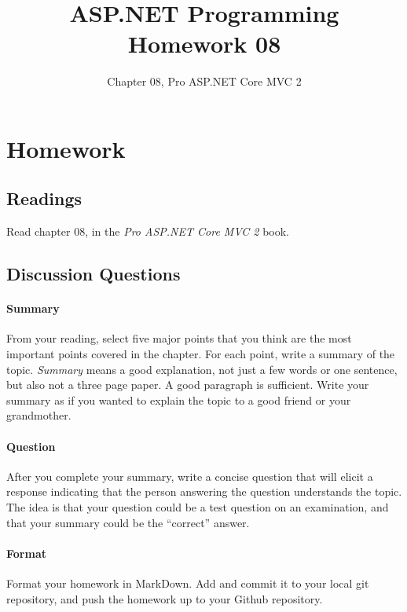 \documentclass{article}
\title{ASP.NET Programming Homework 08}
\author{Chapter 08, Pro ASP.NET Core MVC 2}
\date{}
\begin{document}
    

    \maketitle{}
    \thispagestyle{fancy}

    \section*{Homework}

        \subsection*{Readings}

        Read chapter 08, in the \textit{Pro ASP.NET Core MVC 2} book.
        
        \subsection*{Discussion Questions}

        \paragraph{Summary} From your reading, select five major points that you think are the most important points covered in the chapter. For each point, write a summary of the topic. \textit{Summary} means a good explanation, not just a few words or one sentence, but also not a three page paper. A good paragraph is sufficient. Write your summary as if you wanted to explain the topic to a good friend or your grandmother. 

        \paragraph{Question} After you complete your summary, write a concise question that will elicit a response indicating that the person answering the question understands the topic. The idea is that your question could be a test question on an examination, and that your summary could be the ``correct'' answer.

        \paragraph{Format} Format your homework in MarkDown. Add and commit it to your local git repository, and push the homework up to your Github repository.
\end{document}
